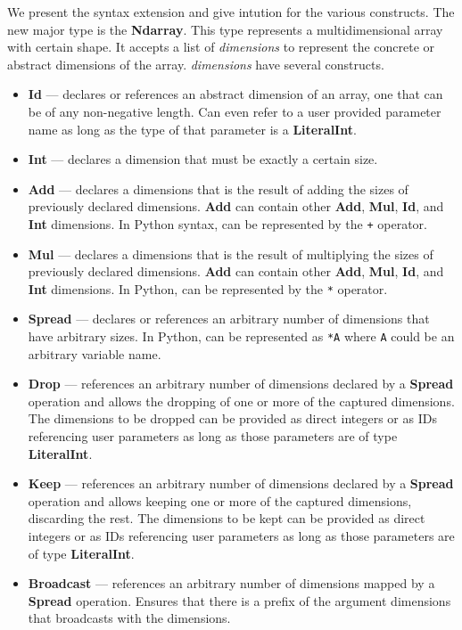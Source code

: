 \documentclass{report}
\begin{document}
We present the syntax extension and give intution for the various constructs. The new major type is the \textbf{Ndarray}. This type represents a multidimensional array with certain shape. It accepts a list of \textit{dimensions} to represent the concrete or abstract dimensions of the array. \textit{dimensions} have several constructs.
\begin{itemize}
    \item \textbf{Id} --- declares or references an abstract dimension of an array, one that can be of any non-negative length. Can even refer to a user provided parameter name as long as the type of that parameter is a \textbf{LiteralInt}.

    \item \textbf{Int} --- declares a dimension that must be exactly a certain size.

    \item \textbf{Add} --- declares a dimensions that is the result of adding the sizes of previously declared dimensions. \textbf{Add} can contain other \textbf{Add}, \textbf{Mul}, \textbf{Id}, and \textbf{Int} dimensions. In Python syntax, can be represented by the \texttt{+} operator.

    \item \textbf{Mul} --- declares a dimensions that is the result of multiplying the sizes of previously declared dimensions. \textbf{Add} can contain other \textbf{Add}, \textbf{Mul}, \textbf{Id}, and \textbf{Int} dimensions. In Python, can be represented by the \texttt{*} operator.

    \item \textbf{Spread} --- declares or references an arbitrary number of dimensions that have arbitrary sizes. In Python, can be represented as \texttt{*A} where \texttt{A} could be an arbitrary variable name.

    \item \textbf{Drop} --- references an arbitrary number of dimensions declared by a \textbf{Spread} operation and allows the dropping of one or more of the captured dimensions. The dimensions to be dropped can be provided as direct integers or as IDs referencing user parameters as long as those parameters are of type \textbf{LiteralInt}.

    \item \textbf{Keep} --- references an arbitrary number of dimensions declared by a \textbf{Spread} operation and allows keeping one or more of the captured dimensions, discarding the rest. The dimensions to be kept can be provided as direct integers or as IDs referencing user parameters as long as those parameters are of type \textbf{LiteralInt}.

    \item \textbf{Broadcast} --- references an arbitrary number of dimensions mapped by a \textbf{Spread} operation. Ensures that there is a prefix of the argument dimensions that broadcasts with the dimensions.

\end{itemize}
\end{document}
